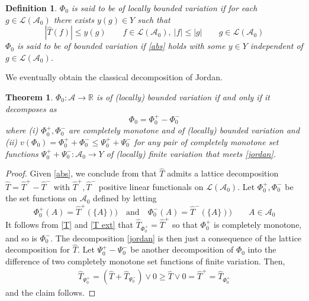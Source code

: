 \documentclass[11pt]{amsart}
\newtheorem{theorem}{Theorem}
\theoremstyle{plain}
\newtheorem{definition}{Definition}
\begin{document}
\begin{definition}
$\Phi_0$ is said to be of locally bounded variation if for each $g\in{\mathscr L({\mathscr{A}}_0)}$ there exists $y(g)\in Y$ 
such that
\begin{equation}
\label{abs}
{\left\vert {\hat T(f)}\right\vert}\le y(g)
\qquad f\in{\mathscr L({\mathscr{A}}_0)},\ {\vert f\vert}\le{\vert g\vert}
\qquad g\in{\mathscr L({\mathscr{A}}_0)}
\end{equation}
$\Phi_0$ is said to be of bounded variation if \eqref{abs} holds with some $y\in Y$
independent of $g\in{\mathscr L({\mathscr{A}}_0)}$.
\end{definition}

We eventually obtain the classical decomposition of Jordan.

\begin{theorem}
\label{th BV}
$\Phi_0:{\mathscr{A}}\to{\mathbb{R}}$ is of (locally) bounded variation if and only if it decomposes as
\begin{equation}
\label{jordan}
\Phi_0=\Phi_0^+-\Phi_0^-
\end{equation}
where (i) $\Phi_0^+,\Phi_0^-$ are completely monotone and of (locally) bounded variation 
and (ii) $v(\Phi_0)=\Phi_0^++\Phi_0^-\le\Psi_0^++\Psi_0^-$ for any pair of completely
monotone set functions $\Psi_0^++\Psi_0^-:{\mathscr{A}}_0\to Y$ of (locally) finite variation that 
meets \eqref{jordan}. 
\end{theorem}

\begin{proof}
Given \eqref{abs}, we conclude from \cite[Theorem 1.10]{aliprantis} that $\hat T$
admits a lattice decomposition $\hat T=\hat T^+-\hat T^-$ with $\hat T^+,\hat T^-$ 
positive linear functionals on ${\mathscr L({\mathscr{A}}_0)}$. Let $\Phi_0^+,\Phi_0^-$ be the set functions on 
${\mathscr{A}}_0$ defined by letting 
\begin{equation*}
\Phi_0^+(A)=\hat T^+(\{A\}))
\quad\text{and}\quad
\Phi_0^-(A)=\hat T^-(\{A\}))
\qquad A\in{\mathscr{A}}_0
\end{equation*}
It follows from \eqref{T} and \eqref{T ext} that $\hat T_{\Phi_0^+}=\hat T^+$
so that $\Phi_0^+$ is completely monotone, and so is $\Phi_0^-$. The decomposition
\eqref{jordan} is then just a consequence of the lattice decomposition for $\hat T$.
Let $\Psi_0^+-\Psi_0^-$ be another decomposition of $\Phi_0$ into the difference of two
completely monotone set functions of finite variation. Then,
\begin{align*}
\hat T_{\Psi_0^+}
=
(\hat T+\hat T_{\Psi_0^-})\vee0
\ge\hat T\vee0
=\hat T^+
=\hat T_{\Phi_0^+}
\end{align*}
and the claim follows.
\end{proof}
\end{document}
